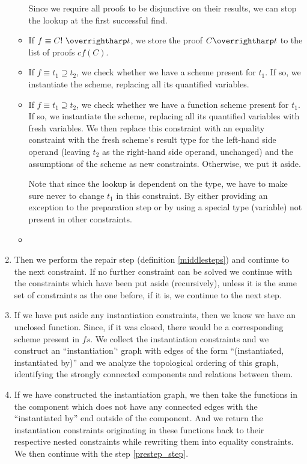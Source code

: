 \begin{enumerate}
\begin{itemize}
        Since we require all proofs to be disjunctive on their results, we can stop the lookup at the first successful find.

        \item If $f \equiv C!\ \vect t$, we store the proof $C \vect t$ to the list of proofs $cf(C)$.

        \item If $f \equiv t_1 \supseteq t_2$, we check whether we have a scheme present for $t_1$. If so, we instantiate the scheme, replacing all its quantified variables.

        \item If $f \equiv t_1 \supseteq t_2$, we check whether we have a function scheme present for $t_1$. If so, we instantiate the scheme, replacing all its quantified variables with fresh variables. We then replace this constraint with an equality constraint with the fresh scheme's result type for the left-hand side operand (leaving $t_2$ as the right-hand side operand, unchanged) and the assumptions of the scheme as new constraints. Otherwise, we put it aside.

        Note that since the lookup is dependent on the type, we have to make sure never to change $t_1$ in this constraint. By either providing an exception to the preparation step or by using a special type (variable) not present in other constraints.

        \item {}
    \end{itemize}

    \item Then we perform the repair step (definition \ref{middlesteps}) and continue to the next constraint. If no further constraint can be solved we continue with the constraints which have been put aside (recursively), unless it is the same set of constraints as the one before, if it is, we continue to the next step.

    \item If we have put aside any instantiation constraints, then we know we have an unclosed function. Since, if it was closed, there would be a corresponding scheme present in $fs$. We collect the instantiation constraints and we construct an ``instantiation'` graph with edges of the form ``(instantiated, instantiated by)'' and we analyze the topological ordering of this graph, identifying the strongly connected components and relations between them.

    \item If we have constructed the instantiation graph, we then take the functions in the component which does not have any connected edges with the ``instantiated by'' end outside of the component. And we return the instantiation constraints originating in these functions back to their respective nested constraints while rewriting them into equality constraints. We then continue with the step \ref{prestep_step}. \label{do_inst_graph}


\end{enumerate}
